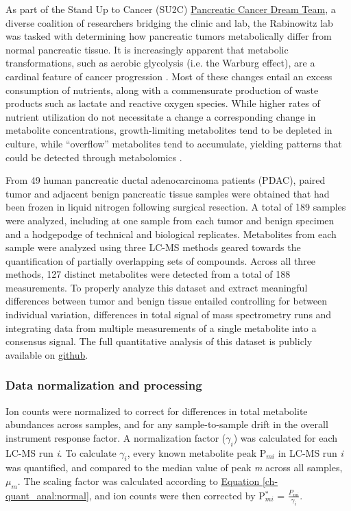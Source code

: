 As part of the Stand Up to Cancer (SU2C) \href{http://www.standup2cancer.org/dream_team_members#Pancreatic}{Pancreatic Cancer Dream Team}, a diverse coalition of researchers bridging the clinic and lab, the Rabinowitz lab was tasked with determining how pancreatic tumors metabolically differ from normal pancreatic tissue.  It is increasingly apparent that metabolic transformations, such as aerobic glycolysis (i.e. the Warburg effect), are a cardinal feature of cancer progression \cite{VanderHeiden:2009gq, Hanahan:2011gu}.  Most of these changes entail an excess consumption of nutrients, along with a commensurate production of waste products such as lactate and reactive oxygen species.  While higher rates of nutrient utilization do not necessitate a change a corresponding change in metabolite concentrations, growth-limiting metabolites tend to be depleted in culture, while ``overflow'' metabolites tend to accumulate, yielding patterns that could be detected through metabolomics \cite{Boer:2010fb}.

From 49 human pancreatic ductal adenocarcinoma patients (PDAC), paired tumor and adjacent benign pancreatic tissue samples were obtained that had been frozen in liquid nitrogen following surgical resection.  A total of 189 samples were analyzed, including at one sample from each tumor and benign specimen and a hodgepodge of technical and biological replicates.  Metabolites from each sample were analyzed using three LC-MS methods geared towards the quantification of partially overlapping sets of compounds. Across all three methods, 127 distinct metabolites were detected from a total of 188 measurements.  To properly analyze this dataset and extract meaningful differences between tumor and benign tissue entailed controlling for between individual variation, differences in total signal of mass spectrometry runs and integrating data from multiple measurements of a single metabolite into a consensus signal. The full quantitative analysis of this dataset is publicly available on \href{https://github.com/shackett/Pancreatic_tumor_metabolomics}{github}.

\subsubsection{Data normalization and processing}

Ion counts were normalized to correct for differences in total metabolite abundances across samples, and for any sample-to-sample drift in the overall instrument response factor.  A normalization factor ($\gamma_{i}$) was calculated for each LC-MS run \textit{i}.  To calculate $\gamma_{i}$, every known metabolite peak P$_{mi}$ in LC-MS run \textit{i} was quantified, and compared to the median value of peak \textit{m} across all samples, $\mu_{m}$.  The scaling factor was calculated according to \hyperref[ch-quant_anal:normal]{Equation \ref{ch-quant_anal:normal}}, and ion counts were then corrected by P$^{*}_{mi}$ = $\frac{P_{mi}}{\gamma_{i}}$.

